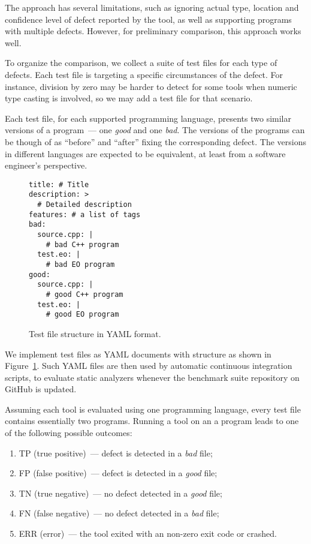 The approach has several limitations, such as ignoring actual type, location and confidence level of defect reported by the tool, as well as supporting programs with multiple defects. However, for preliminary comparison, this approach works well.

To organize the comparison, we collect a suite of test files for each type of defects.
Each test file is targeting a specific circumstances of the defect. For instance, division by zero may be harder to detect for some tools when numeric type casting is involved, so we may add a test file for that scenario.

Each test file, for each supported programming language, presents two similar versions of a program~--- one \emph{good} and one \emph{bad}. The versions of the programs can be though of as ``before'' and ``after'' fixing the corresponding defect. The versions in different languages are expected to be equivalent, at least from a software engineer's perspective.

\begin{figure}[ht]
    \centering
    \begin{mdframed}
\begin{verbatim}
title: # Title
description: >
  # Detailed description
features: # a list of tags
bad:
  source.cpp: |
    # bad C++ program
  test.eo: |
    # bad EO program
good:
  source.cpp: |
    # good C++ program
  test.eo: |
    # good EO program
\end{verbatim}
    \end{mdframed}
    \caption{Test file structure in YAML format.}
    \label{fig:test-file}
\end{figure}

We implement test files as YAML documents with structure as shown in Figure~\ref{fig:test-file}. Such YAML files are then used by automatic continuous integration scripts, to evaluate static analyzers whenever the benchmark suite repository on GitHub is updated.

Assuming each tool is evaluated using one programming language, every test file contains essentially two programs. Running a tool on an a program leads to one of the following possible outcomes:
\begin{enumerate}
    \item TP (true positive)~--- defect is detected in a \emph{bad} file;
    \item FP (false positive)~--- defect is detected in a \emph{good} file;
    \item TN (true negative)~--- no defect detected in a \emph{good} file;
    \item FN (false negative)~--- no defect detected in a \emph{bad} file;
    \item ERR (error)~--- the tool exited with an non-zero exit code or crashed.
\end{enumerate}

